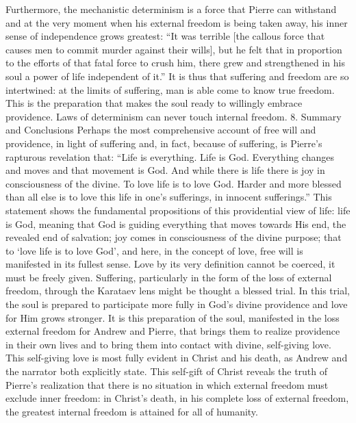 Furthermore, the mechanistic determinism is a force that Pierre can withstand and at the very moment when his external freedom is being taken away, his inner sense of independence grows greatest: “It was terrible [the callous force that causes men to commit murder against their wills], but he felt that in proportion to the efforts of that fatal force to crush him, there grew and strengthened in his soul a power of life independent of it.”  It is thus that suffering and freedom are so intertwined: at the limits of suffering, man is able come to know true freedom. This is the preparation that makes the soul ready to willingly embrace providence. Laws of determinism can never touch internal freedom. 
8. Summary and Conclusions
Perhaps the most comprehensive account of free will and providence, in light of suffering and, in fact, because of suffering, is Pierre’s rapturous revelation that: “Life is everything. Life is God. Everything changes and moves and that movement is God. And while there is life there is joy in consciousness of the divine. To love life is to love God. Harder and more blessed than all else is to love this life in one’s sufferings, in innocent sufferings.”  This statement shows the fundamental propositions of this providential view of life: life is God, meaning that God is guiding everything that moves towards His end, the revealed end of salvation; joy comes in consciousness of the divine purpose; that to ‘love life is to love God’, and here, in the concept of love, free will is manifested in its fullest sense. Love by its very definition cannot be coerced, it must be freely given. Suffering, particularly in the form of the loss of external freedom, through the Karataev lens might be thought a blessed trial. In this trial, the soul is prepared to participate more fully in God’s divine providence and love for Him grows stronger. It is this preparation of the soul, manifested in the loss external freedom for Andrew and Pierre, that brings them to realize providence in their own lives and to bring them into contact with divine, self-giving love. This self-giving love is most fully evident in Christ and his death, as Andrew and the narrator both explicitly state. This self-gift of Christ reveals the truth of Pierre’s realization that there is no situation in which external freedom must exclude inner freedom: in Christ’s death, in his complete loss of external freedom, the greatest internal freedom is attained for all of humanity.











